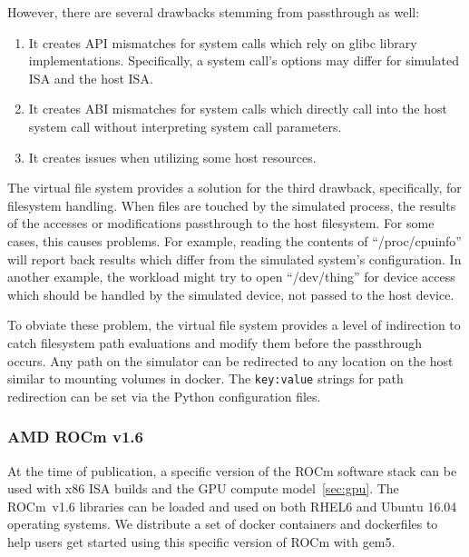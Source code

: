 However, there are several drawbacks stemming from passthrough as well:
\begin{enumerate}
    \item It creates API mismatches for system calls which rely on glibc library implementations. Specifically, a system call's options may differ for simulated ISA and the host ISA.
    \item It creates ABI mismatches for system calls which directly call into the host system call without interpreting system call parameters.
    \item It creates issues when utilizing some host resources.
\end{enumerate}

The virtual file system provides a solution for the third drawback, specifically, for filesystem handling.
When files are touched by the simulated process, the results of the accesses or modifications passthrough to the host filesystem.
For some cases, this causes problems.
For example, reading the contents of ``/proc/cpuinfo'' will report back results which differ from the simulated system's configuration.
In another example, the workload might try to open ``/dev/thing'' for device access which should be handled by the simulated device, not passed to the host device.

To obviate these problem, the virtual file system provides a level of indirection to catch filesystem path evaluations and modify them before the passthrough occurs.
Any path on the simulator can be redirected to any location on the host similar to mounting volumes in docker.
The \verb|key:value| strings for path redirection can be set via the Python configuration files.

\subsubsection{AMD ROCm v1.6}

At the time of publication, a specific version of the ROCm software stack can be used with x86 ISA builds and the GPU compute model~\ref{sec:gpu}.
The ROCm~v1.6 libraries can be loaded and used on both RHEL6 and Ubuntu 16.04 operating systems.
We distribute a set of docker containers and dockerfiles to help users get started using this specific version of ROCm with gem5.
